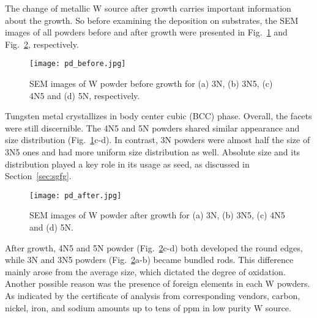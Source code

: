 The change of metallic W source after growth carries important information about the growth. So before examining the deposition on substrates, the SEM images of all powders before and after growth were presented in Fig.~\ref{fig:pdbefore} and Fig.~\ref{fig:pdafter}, respectively.
\begin{figure}[htb]
\centering
\texttt{[image: pd\_before.jpg]}
\caption[SEM images of W powder before growth]{SEM images of W powder before growth for (a) 3N, (b) 3N5, (c) 4N5 and (d) 5N, respectively.}
\label{fig:pdbefore}
\end{figure}
Tungsten metal crystallizes in body center cubic (BCC) phase. Overall, the facets were still discernible. The 4N5 and 5N powders shared similar appearance and size distribution (Fig.~\ref{fig:pdbefore}c-d). In contrast, 3N powders were almost half the size of 3N5 ones and had more uniform size distribution as well. Absolute size and its distribution played a key role in its usage as seed, as discussed in Section~\ref{sec:sgfg}.
\begin{figure}[htb]
\centering
\texttt{[image: pd\_after.jpg]}
\caption[SEM images of W powder after growth]{SEM images of W powder after growth for (a) 3N, (b) 3N5, (c) 4N5 and (d) 5N. }
\label{fig:pdafter}
\end{figure}
After growth, 4N5 and 5N powder (Fig.~\ref{fig:pdafter}c-d) both developed the round edges, while 3N and 3N5 powders (Fig.~\ref{fig:pdafter}a-b) became bundled rods. This difference mainly arose from the average size, which dictated the degree of oxidation. Another possible reason was the presence of foreign elements in each W powders. As indicated by the certificate of analysis from corresponding vendors, carbon, nickel, iron, and sodium amounts up to tens of ppm in low purity W source. 

